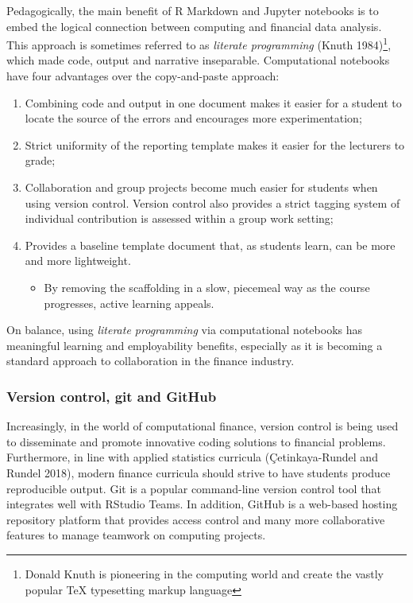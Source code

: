 \documentclass{article}
\begin{document}
Pedagogically, the main benefit of R Markdown and Jupyter notebooks is
to embed the logical connection between computing and financial data
analysis. This approach is sometimes referred to as \emph{literate
programming} (Knuth 1984)\footnote{Donald Knuth is pioneering in the
  computing world and create the vastly popular TeX typesetting markup
  language}, which made code, output and narrative inseparable.
Computational notebooks have four advantages over the copy-and-paste
approach:

\begin{enumerate}
\def\labelenumi{\arabic{enumi}.}
\tightlist
\item
  Combining code and output in one document makes it easier for a
  student to locate the source of the errors and encourages more
  experimentation;
\item
  Strict uniformity of the reporting template makes it easier for the
  lecturers to grade;
\item
  Collaboration and group projects become much easier for students when
  using version control. Version control also provides a strict tagging
  system of individual contribution is assessed within a group work
  setting;
\item
  Provides a baseline template document that, as students learn, can be
  more and more lightweight.

  \begin{itemize}
  \tightlist
  \item
    By removing the scaffolding in a slow, piecemeal way as the course
    progresses, active learning appeals.
  \end{itemize}
\end{enumerate}

On balance, using \emph{literate programming} via computational
notebooks has meaningful learning and employability benefits, especially
as it is becoming a standard approach to collaboration in the finance
industry.

\hypertarget{version-control-git-and-github}{%
\subsubsection{Version control, git and
GitHub}\label{version-control-git-and-github}}

Increasingly, in the world of computational finance, version control is
being used to disseminate and promote innovative coding solutions to
financial problems. Furthermore, in line with applied statistics
curricula (Çetinkaya-Rundel and Rundel 2018), modern finance curricula
should strive to have students produce reproducible output. Git is a
popular command-line version control tool that integrates well with
RStudio Teams. In addition, GitHub is a web-based hosting repository
platform that provides access control and many more collaborative
features to manage teamwork on computing projects.
\end{document}
